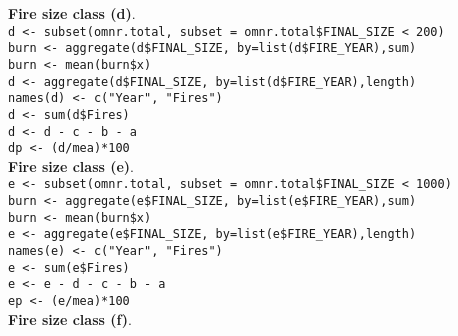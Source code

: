 \begin{spacing}{1.5}
\noindent \textbf{Fire size class (d)}. \\

\noindent \texttt{d <- subset(omnr.total, subset = omnr.total\$FINAL\_SIZE < 200)} \\

\noindent \texttt{burn <- aggregate(d\$FINAL\_SIZE, by=list(d\$FIRE\_YEAR),sum)} \\

\noindent \texttt{burn <- mean(burn\$x)} \\
                     
\noindent \texttt{d <- aggregate(d\$FINAL\_SIZE, by=list(d\$FIRE\_YEAR),length)} \\

\noindent \texttt{names(d) <- c("Year", "Fires")} \\

\noindent \texttt{d <- sum(d\$Fires)} \\

\noindent \texttt{d <- d - c - b - a} \\

\noindent \texttt{dp <- (d/mea)*100} \\

\noindent \textbf{Fire size class (e)}. \\

\noindent \texttt{e <- subset(omnr.total, subset = omnr.total\$FINAL\_SIZE < 1000)} \\

\noindent \texttt{burn <- aggregate(e\$FINAL\_SIZE, by=list(e\$FIRE\_YEAR),sum)} \\

\noindent \texttt{burn <- mean(burn\$x)} \\
                     
\noindent \texttt{e <- aggregate(e\$FINAL\_SIZE, by=list(e\$FIRE\_YEAR),length)} \\

\noindent \texttt{names(e) <- c("Year", "Fires")} \\

\noindent \texttt{e <- sum(e\$Fires)} \\

\noindent \texttt{e <- e - d - c - b - a} \\

\noindent \texttt{ep <- (e/mea)*100} \\

\noindent \textbf{Fire size class (f)}. \\


\end{spacing}
